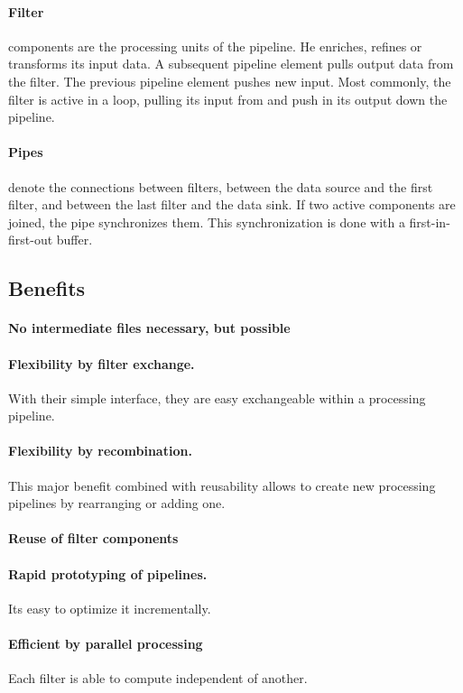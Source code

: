 \documentclass[a4paper,11pt,twocolumn]{report}
\begin{document}
    \paragraph{Filter} components are the processing units of the pipeline. He
    enriches, refines or transforms its input data. A subsequent pipeline
    element pulls output data from the filter. The previous pipeline element
    pushes new input. Most commonly, the filter is active in a loop, pulling
    its input from and push in its output down the pipeline.
    \paragraph{Pipes} denote the connections between filters, between the data
    source and the first filter, and between the last filter and the data sink.
    If two active components are joined, the pipe synchronizes them.
    This synchronization is done with a first-in-first-out buffer.
    \subsection{Benefits}
    \paragraph{No intermediate files necessary, but possible}
    \paragraph{Flexibility by filter exchange.} With their simple interface,
    they are easy exchangeable within a processing pipeline.
    \paragraph{Flexibility by recombination.} This major benefit combined with
    reusability allows to create new processing pipelines by rearranging or
    adding one.
    \paragraph{Reuse of filter components}
    \paragraph{Rapid prototyping of pipelines.}
    Its easy to optimize it incrementally.
    \paragraph{Efficient by parallel processing}
    Each filter is able to compute independent of another.
\end{document}
